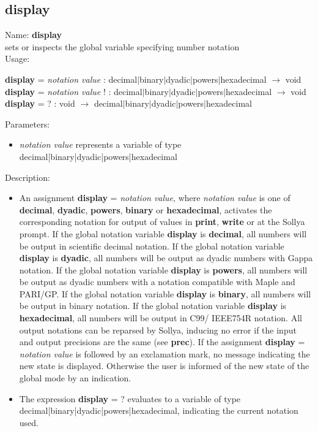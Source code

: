 \subsection{ display }
\noindent Name: \textbf{display}\\
sets or inspects the global variable specifying number notation\\

\noindent Usage: 
\begin{center}
\textbf{display} = \emph{notation value} : \textsf{decimal$|$binary$|$dyadic$|$powers$|$hexadecimal} $\rightarrow$ \textsf{void}\\
\textbf{display} = \emph{notation value} ! : \textsf{decimal$|$binary$|$dyadic$|$powers$|$hexadecimal} $\rightarrow$ \textsf{void}\\
\textbf{display} = ? : \textsf{void} $\rightarrow$ \textsf{decimal$|$binary$|$dyadic$|$powers$|$hexadecimal}\\
\end{center}
Parameters: 
\begin{itemize}
\item \emph{notation value} represents a variable of type \textsf{decimal|binary|dyadic|powers|hexadecimal}
\end{itemize}
\noindent Description: \begin{itemize}

\item An assignment \textbf{display} = \emph{notation value}, where \emph{notation value} is
   one of \textbf{decimal}, \textbf{dyadic}, \textbf{powers}, \textbf{binary} or \textbf{hexadecimal}, activates
   the corresponding notation for output of values in \textbf{print}, \textbf{write} or
   at the Sollya prompt.
   If the global notation variable \textbf{display} is \textbf{decimal}, all numbers will
   be output in scientific decimal notation.  If the global notation
   variable \textbf{display} is \textbf{dyadic}, all numbers will be output as dyadic
   numbers with Gappa notation.  If the global notation variable \textbf{display}
   is \textbf{powers}, all numbers will be output as dyadic numbers with a
   notation compatible with Maple and PARI/GP.  If the global notation
   variable \textbf{display} is \textbf{binary}, all numbers will be output in binary
   notation.  If the global notation variable \textbf{display} is \textbf{hexadecimal},
   all numbers will be output in C99/ IEEE754R notation.  All output
   notations can be reparsed by Sollya, inducing no error if the input
   and output precisions are the same (see \textbf{prec}).
   If the assignment \textbf{display} = \emph{notation value} is followed by an
   exclamation mark, no message indicating the new state is
   displayed. Otherwise the user is informed of the new state of the
   global mode by an indication.

\item The expression \textbf{display} = ? evaluates to a variable of type
   \textsf{decimal|binary|dyadic|powers|hexadecimal}, indicating the current notation used.
\end{itemize}
